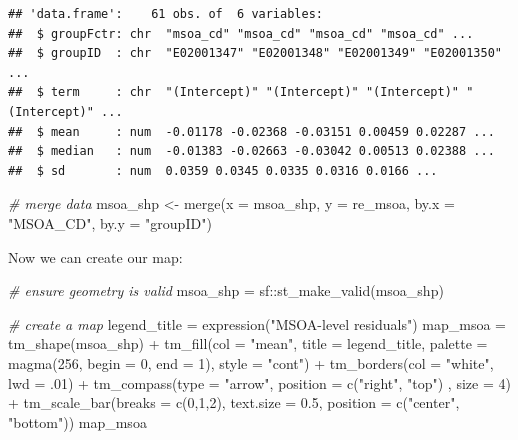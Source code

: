 \documentclass[
]{book}
\newenvironment{Shaded}{\begin{snugshade}}{\end{snugshade}}
\newcommand{\AttributeTok}[1]{\textcolor[rgb]{0.77,0.63,0.00}{#1}}
\newcommand{\CommentTok}[1]{\textcolor[rgb]{0.56,0.35,0.01}{\textit{#1}}}
\newcommand{\DecValTok}[1]{\textcolor[rgb]{0.00,0.00,0.81}{#1}}
\newcommand{\FloatTok}[1]{\textcolor[rgb]{0.00,0.00,0.81}{#1}}
\newcommand{\FunctionTok}[1]{\textcolor[rgb]{0.00,0.00,0.00}{#1}}
\newcommand{\NormalTok}[1]{#1}
\newcommand{\OtherTok}[1]{\textcolor[rgb]{0.56,0.35,0.01}{#1}}
\newcommand{\SpecialCharTok}[1]{\textcolor[rgb]{0.00,0.00,0.00}{#1}}
\newcommand{\StringTok}[1]{\textcolor[rgb]{0.31,0.60,0.02}{#1}}
\begin{document}
\begin{verbatim}
## 'data.frame':    61 obs. of  6 variables:
##  $ groupFctr: chr  "msoa_cd" "msoa_cd" "msoa_cd" "msoa_cd" ...
##  $ groupID  : chr  "E02001347" "E02001348" "E02001349" "E02001350" ...
##  $ term     : chr  "(Intercept)" "(Intercept)" "(Intercept)" "(Intercept)" ...
##  $ mean     : num  -0.01178 -0.02368 -0.03151 0.00459 0.02287 ...
##  $ median   : num  -0.01383 -0.02663 -0.03042 0.00513 0.02388 ...
##  $ sd       : num  0.0359 0.0345 0.0335 0.0316 0.0166 ...
\end{verbatim}

\begin{Shaded}
\begin{Highlighting}[]
\CommentTok{\# merge data}
\NormalTok{msoa\_shp }\OtherTok{\textless{}{-}} \FunctionTok{merge}\NormalTok{(}\AttributeTok{x =}\NormalTok{ msoa\_shp, }\AttributeTok{y =}\NormalTok{ re\_msoa, }\AttributeTok{by.x =} \StringTok{"MSOA\_CD"}\NormalTok{, }\AttributeTok{by.y =} \StringTok{"groupID"}\NormalTok{)}
\end{Highlighting}
\end{Shaded}

Now we can create our map:

\begin{Shaded}
\begin{Highlighting}[]
\CommentTok{\# ensure geometry is valid}
\NormalTok{msoa\_shp }\OtherTok{=}\NormalTok{ sf}\SpecialCharTok{::}\FunctionTok{st\_make\_valid}\NormalTok{(msoa\_shp)}

\CommentTok{\# create a map}
\NormalTok{legend\_title }\OtherTok{=} \FunctionTok{expression}\NormalTok{(}\StringTok{"MSOA{-}level residuals"}\NormalTok{)}
\NormalTok{map\_msoa }\OtherTok{=} \FunctionTok{tm\_shape}\NormalTok{(msoa\_shp) }\SpecialCharTok{+}
  \FunctionTok{tm\_fill}\NormalTok{(}\AttributeTok{col =} \StringTok{"mean"}\NormalTok{, }\AttributeTok{title =}\NormalTok{ legend\_title, }\AttributeTok{palette =} \FunctionTok{magma}\NormalTok{(}\DecValTok{256}\NormalTok{, }\AttributeTok{begin =} \DecValTok{0}\NormalTok{, }\AttributeTok{end =} \DecValTok{1}\NormalTok{), }\AttributeTok{style =} \StringTok{"cont"}\NormalTok{) }\SpecialCharTok{+} 
  \FunctionTok{tm\_borders}\NormalTok{(}\AttributeTok{col =} \StringTok{"white"}\NormalTok{, }\AttributeTok{lwd =}\NormalTok{ .}\DecValTok{01}\NormalTok{)  }\SpecialCharTok{+} 
  \FunctionTok{tm\_compass}\NormalTok{(}\AttributeTok{type =} \StringTok{"arrow"}\NormalTok{, }\AttributeTok{position =} \FunctionTok{c}\NormalTok{(}\StringTok{"right"}\NormalTok{, }\StringTok{"top"}\NormalTok{) , }\AttributeTok{size =} \DecValTok{4}\NormalTok{) }\SpecialCharTok{+} 
  \FunctionTok{tm\_scale\_bar}\NormalTok{(}\AttributeTok{breaks =} \FunctionTok{c}\NormalTok{(}\DecValTok{0}\NormalTok{,}\DecValTok{1}\NormalTok{,}\DecValTok{2}\NormalTok{), }\AttributeTok{text.size =} \FloatTok{0.5}\NormalTok{, }\AttributeTok{position =}  \FunctionTok{c}\NormalTok{(}\StringTok{"center"}\NormalTok{, }\StringTok{"bottom"}\NormalTok{)) }
\NormalTok{map\_msoa}
\end{Highlighting}
\end{Shaded}
\end{document}
